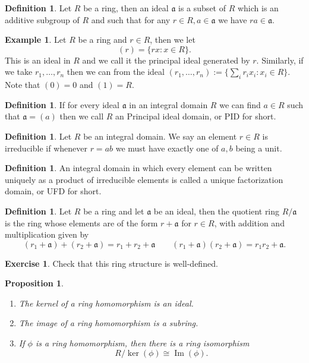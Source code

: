 \documentclass[11pt,a4paper]{report}
\theoremstyle{plain}
\newtheorem{prop}[subsection]{Proposition}
\theoremstyle{definition}
\newtheorem{defn}[subsection]{Definition}
\newtheorem{exmp}[subsection]{Example}
\theoremstyle{definition}
\newtheorem{question}[subsection]{Exercise}
\def\gotha{\mathfrak{a}}
\DeclareMathOperator{\im}{Im}
\begin{document}
	\begin{defn}
		Let $R$ be a ring, then an ideal $\gotha$ is a subset of $R$ which is an additive subgroup of $R$ and such that for any $r \in R, a \in \gotha$ we have $ra \in \gotha$.
	\end{defn}
	\begin{exmp}
		Let $R$ be a ring and $r \in R$, then we let \[(r)=\{rx : x \in R\}.\] This is an ideal in $R$ and we call it the principal ideal generated by $r$. Similarly, if we take $r_1,\dots,r_n$ then we can from the ideal $(r_1,\dots,r_n):=\{\sum_i r_i x_i : x_i \in R\}$. Note that $(0)=0$ and $(1)=R$.
	\end{exmp}
	
	\begin{defn}
		If for every ideal $\gotha$ in an integral domain $R$ we can find $a \in R$ such that $\gotha=(a)$ then we call $R$ an Principal ideal domain, or PID for short.
	\end{defn}
	
	\begin{defn}\label{defn: irr elt}
		Let $R$ be an integral domain. We say an element $r \in R$ is irreducible if whenever $r=ab$ we must have exactly one of $a,b$ being a unit.
	\end{defn}
	
	\begin{defn}
		An integral domain in which every element can be written uniquely as a product of irreducible elements is called a unique factorization domain, or UFD for short.
	\end{defn}
	\begin{defn}
		Let $R$ be a ring and let $\gotha$ be an ideal, then the quotient ring $R/\gotha$ is the ring whose elements are of the form $r+\gotha$ for $r \in R$, with addition and multiplication given by \[(r_1+ \gotha) + (r_2+\gotha)=r_1+r_2 + \gotha \qquad (r_1+\gotha)(r_2+\gotha)=r_1r_2 + \gotha. \]
	\end{defn}
	\begin{question}
		Check that this ring structure is well-defined.
	\end{question}
	
	\begin{prop}\label{prop: ques about rings}
		\begin{enumerate}
			\item The kernel of a ring homomorphism is an ideal.
			\item The image of a ring homomorphism is a subring.
			\item If $\phi$  is a ring homomorphism, then there is a ring isomorphism \[R / \ker(\phi) \cong \im(\phi).\]
		\end{enumerate}
	\end{prop}
	
\end{document}
